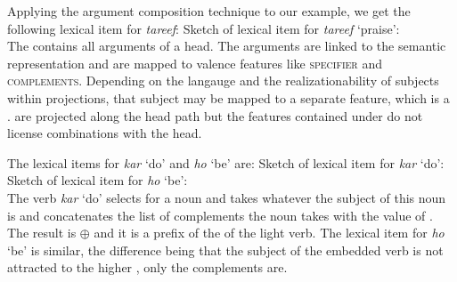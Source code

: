 Applying the argument composition technique to our example, we get the following lexical item for
\emph{tareef}:
\ea
Sketch of lexical item for \emph{tareef} `praise':\\
\z
\largerpage
The \argstl contains all arguments of a head. The arguments are linked to the semantic representation
and are mapped to valence features like \textsc{specifier} and \textsc{complements}. Depending on
the langauge and the realizationability of subjects within projections, that subject may be mapped to
a separate feature, which is a \headf. \headfs are projected along the head path but the features
contained under \head do not license combinations with the head.

The lexical items for \emph{kar} `do' and  \emph{ho} `be' are:
\eal
\ex Sketch of lexical item for \emph{kar} `do':\\
\ex Sketch of lexical item for \emph{ho} `be':\\
\zl
The verb \emph{kar} `do' selects for a noun and takes whatever the subject of this noun is  and 
concatenates the list of complements the noun takes  with the value of \subj. The result is  $\oplus$
 and it is a prefix of the \argstl of the light verb. 
The lexical item for \emph{ho} `be' is similar, the difference being that the subject of the
embedded verb is not attracted to the higher \argstl, only the complements  are.

